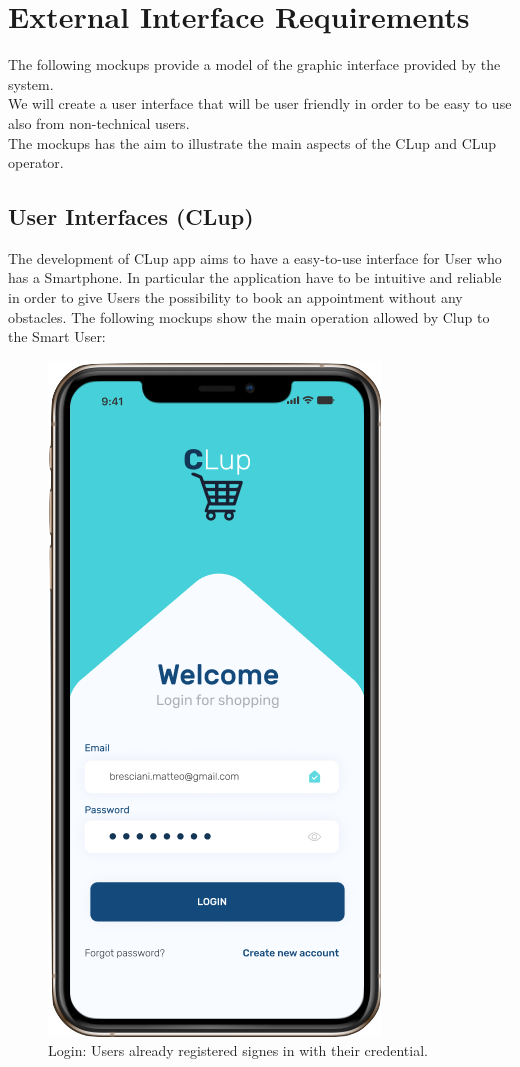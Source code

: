 \section{External Interface Requirements}
The following mockups provide a model of the graphic interface provided by the system. \\
We will create a user interface that will be user friendly in order to be easy to use also from non-technical users. \\
The mockups has the aim to illustrate the main aspects of the CLup and CLup operator.
\subsection{User Interfaces (CLup)}
The development of CLup app aims to have a easy-to-use interface for User who has a Smartphone. In particular the application have to be intuitive and reliable in order to give Users the possibility to book an appointment without any obstacles.
The following mockups show the main operation allowed by Clup to the Smart User:
\begin{figure}[h]
  \caption{Login: Users already registered signes in with their credential.}
  \label{fig: Login}
  \centering
  \includegraphics[scale=0.35]{images/mockup/login.png}
\end{figure}
